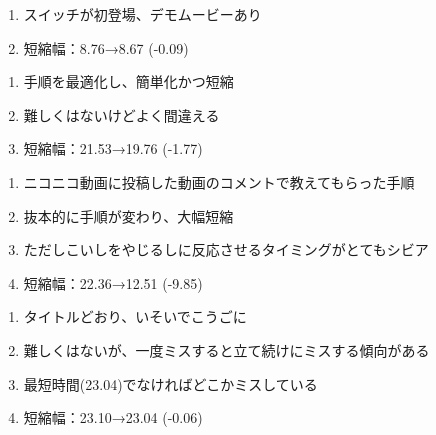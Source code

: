 \begin{enumerate}[label={\sarrow}]
\item スイッチが初登場、デモムービーあり
\item 短縮幅：8.76→8.67 (-0.09)
\end{enumerate}



\begin{enumerate}[label={\sarrow}]
\item 手順を最適化し、簡単化かつ短縮
\item 難しくはないけどよく間違える
\item 短縮幅：21.53→19.76 (-1.77)
\end{enumerate}



\begin{enumerate}[label={\sarrow}]
\item ニコニコ動画に投稿した動画のコメントで教えてもらった手順
\item 抜本的に手順が変わり、大幅短縮
\item ただしこいしをやじるしに反応させるタイミングがとてもシビア
\item 短縮幅：22.36→12.51 (-9.85)
\end{enumerate}



\begin{enumerate}[label={\sarrow}]
\item タイトルどおり、いそいでこうごに
\item 難しくはないが、一度ミスすると立て続けにミスする傾向がある
\item 最短時間(23.04)でなければどこかミスしている
\item 短縮幅：23.10→23.04 (-0.06)
\end{enumerate}



